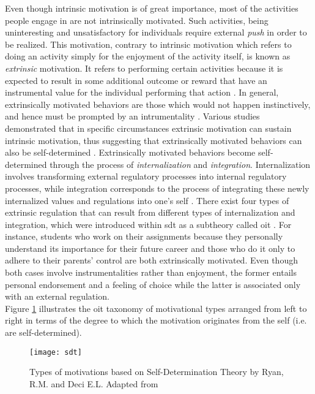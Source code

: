 Even though intrinsic motivation is of great importance, most of the activities people engage in are not intrinsically motivated. Such activities, being uninteresting and unsatisfactory for individuals  require external \textit{push} in order to be realized. This motivation, contrary to intrinsic motivation which refers to doing an activity simply for the enjoyment of the activity itself, is known as \textit{extrinsic} motivation. It refers to performing certain activities because it is expected to result in some additional outcome or reward that have an instrumental value for the individual performing that action \cite{ryan2000self}. In general, extrinsically motivated behaviors are those which would not happen instinctively, and hence must be prompted by an intrumentality \cite{deci1994promoting}. Various studies demonstrated that in specific circumstances extrinsic motivation can sustain intrinsic motivation, thus suggesting that extrinsically motivated behaviors can also be self-determined \cite{deci1994promoting}. Extrinsically motivated behaviors become self-determined through the process of \textit{internalization} and \textit{integration}. Internalization involves transforming external regulatory processes into internal regulatory processes, while integration corresponds to the process of integrating these newly internalized values and regulations into one's self \cite{deci1994promoting}. There exist four types of extrinsic regulation that can result from different types of internalization and integration, which were introduced within \acrshort{sdt} as a subtheory called \acrfull{oit} \cite{deci1994promoting, ryan2000intrinsic, ryan2000self}. For instance, students who work on their assignments because they personally understand its importance for their future career and those who do it only to adhere to their parents' control are both extrinsically motivated. Even though both cases involve instrumentalities rather than enjoyment, the former entails personal endorsement and a feeling of choice while the latter is associated only with an external regulation.\\
Figure \ref{fig:tax} illustrates the \acrshort{oit} taxonomy of motivational types arranged from left to right in terms of the degree to which the motivation originates from the self (i.e. are self-determined).\\ 
\begin{figure}[h]
    \centering
    \texttt{[image: sdt]}
    \caption{Types of motivations based on Self-Determination  Theory by Ryan, R.M. and Deci E.L. Adapted from  \cite{ryan2000intrinsic}}
    \label{fig:tax}
\end{figure}\\
